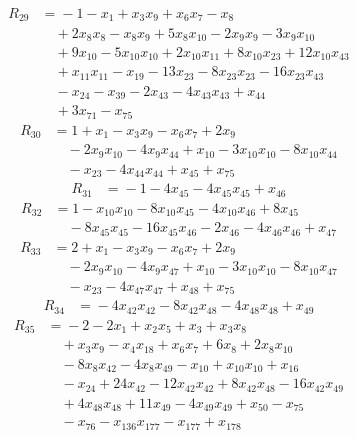 \begin{align*}
R_{29}&={}-1 -x_{1} +x_{3}x_{9} +x_{6}x_{7} -x_{8}\\
&\quad{}+2x_{8}x_{8} -x_{8}x_{9} +5x_{8}x_{10} -2x_{9}x_{9} -3x_{9}x_{10}\\
&\quad{}+9x_{10} -5x_{10}x_{10} +2x_{10}x_{11} +8x_{10}x_{23} +12x_{10}x_{43}\\
&\quad{}+x_{11}x_{11} -x_{19} -13x_{23} -8x_{23}x_{23} -16x_{23}x_{43}\\
&\quad{}-x_{24} -x_{39} -2x_{43} -4x_{43}x_{43} +x_{44}\\
&\quad{}+3x_{71} -x_{75}
\end{align*}
\begin{align*}
R_{30}&={}1 +x_{1} -x_{3}x_{9} -x_{6}x_{7} +2x_{9}\\
&\quad{}-2x_{9}x_{10} -4x_{9}x_{44} +x_{10} -3x_{10}x_{10} -8x_{10}x_{44}\\
&\quad{}-x_{23} -4x_{44}x_{44} +x_{45} +x_{75}
\end{align*}
\begin{align*}
R_{31}&={}-1 -4x_{45} -4x_{45}x_{45} +x_{46}
\end{align*}
\begin{align*}
R_{32}&={}1 -x_{10}x_{10} -8x_{10}x_{45} -4x_{10}x_{46} +8x_{45}\\
&\quad{}-8x_{45}x_{45} -16x_{45}x_{46} -2x_{46} -4x_{46}x_{46} +x_{47}
\end{align*}
\begin{align*}
R_{33}&={}2 +x_{1} -x_{3}x_{9} -x_{6}x_{7} +2x_{9}\\
&\quad{}-2x_{9}x_{10} -4x_{9}x_{47} +x_{10} -3x_{10}x_{10} -8x_{10}x_{47}\\
&\quad{}-x_{23} -4x_{47}x_{47} +x_{48} +x_{75}
\end{align*}
\begin{align*}
R_{34}&={}-4x_{42}x_{42} -8x_{42}x_{48} -4x_{48}x_{48} +x_{49}
\end{align*}
\begin{align*}
R_{35}&={}-2 -2x_{1} +x_{2}x_{5} +x_{3} +x_{3}x_{8}\\
&\quad{}+x_{3}x_{9} -x_{4}x_{18} +x_{6}x_{7} +6x_{8} +2x_{8}x_{10}\\
&\quad{}-8x_{8}x_{42} -4x_{8}x_{49} -x_{10} +x_{10}x_{10} +x_{16}\\
&\quad{}-x_{24} +24x_{42} -12x_{42}x_{42} +8x_{42}x_{48} -16x_{42}x_{49}\\
&\quad{}+4x_{48}x_{48} +11x_{49} -4x_{49}x_{49} +x_{50} -x_{75}\\
&\quad{}-x_{76} -x_{136}x_{177} -x_{177} +x_{178}
\end{align*}
